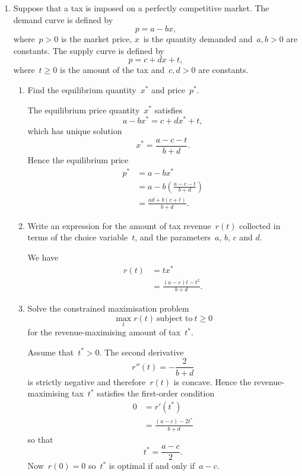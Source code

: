 \begin{enumerate}
\begin{enumerate}
	\end{enumerate}

	\item
	Suppose that a tax is imposed on a perfectly competitive market.
	The demand curve is defined by
	\[ p=a-bx, \]
	where~$p>0$ is the market price, $x$~is the quantity demanded and~$a,b>0$ are constants.
	The supply curve is defined by
	\[ p=c+dx+t, \]
	where~$t\ge0$ is the amount of the tax and~$c,d>0$ are constants.
	\begin{enumerate}

		\item
		Find the equilibrium quantity~$x^*$ and price~$p^*$.
		\begin{solution}
			The equilibrium price quantity~$x^*$ satisfies
			\[ a-bx^*=c+dx^*+t, \]
			which has unique solution
			\[ x^*=\frac{a-c-t}{b+d}. \]
			Hence the equilibrium price
			\begin{align}
				p^*
				&= a-bx^*\\
				&= a-b\left(\frac{a-c-t}{b+d}\right)\\
				&= \frac{ad+b(c+t)}{b+d}. 
			\end{align}
		\end{solution}

		\item
		Write an expression for the amount of tax revenue~$r(t)$ collected in terms of the choice variable~$t$, and the parameters~$a$, $b$, $c$ and $d$.
		\begin{solution}
			We have
			\begin{align}
				r(t)
				&= tx^*\\
				&= \frac{(a-c)t-t^2}{b+d}.
			\end{align}
		\end{solution}

		\item
		Solve the constrained maximisation problem
		\[ \max_tr(t)\ \text{subject to}\ t\ge0 \label{eq:tax_c_prob} \]
		for the revenue-maximising amount of tax~$t^*$.
		\begin{solution}
			Assume that~$t^*>0$.
			The second derivative
			\[ r''(t)=-\frac{2}{b+d} \]
			is strictly negative and therefore~$r(t)$ is concave.
			Hence the revenue-maximising tax~$t^*$ satisfies the first-order condition
			\begin{align}
				0
				&= r'(t^*)\\
				&= \frac{(a-c)-2t^*}{b+d}
			\end{align}
			so that
			\[ t^*=\frac{a-c}{2}. \]
			Now~$r(0)=0$ so~$t^*$ is optimal if and only if~$a-c$.
		\end{solution}


\end{enumerate}
\end{enumerate}

